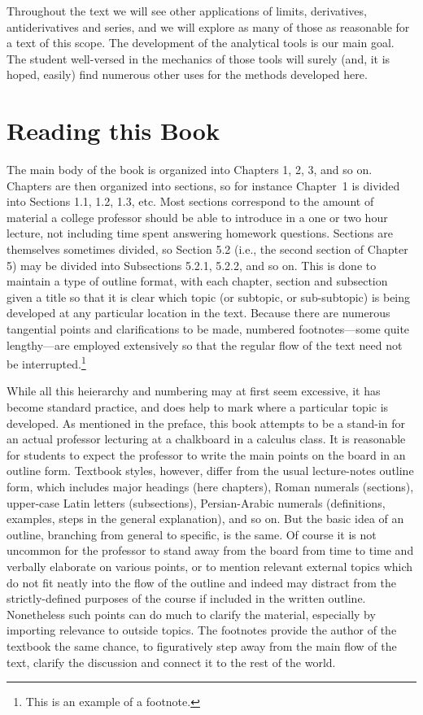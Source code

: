 Throughout the text we will see other applications of 
limits, derivatives, antiderivatives and series, and we will
explore as many of those as reasonable for a text of this scope.
The development of the analytical tools is our main goal.  The
student well-versed in the mechanics of those tools will surely
(and, it is hoped, easily) find
numerous other uses for the methods developed here.


\chapter{Reading this Book}

The main body of the book is organized into Chapters 1, 2, 3, and so on.
Chapters are then organized into sections, so for
instance Chapter~1 is
divided into Sections 1.1, 1.2, 1.3, etc.
Most sections correspond to the amount of material a college professor
should be able to introduce in a one or two hour lecture, not including
time spent answering homework questions.
Sections are themselves sometimes divided, so Section 5.2
(i.e., the second section of Chapter 5) may
be divided into Subsections 5.2.1, 5.2.2, and so on.
This is done to maintain a type of outline format,
with each chapter, section and subsection given a
title so that it is clear which topic (or subtopic, or sub-subtopic)
is being developed at any particular location in the text.  
Because there are numerous tangential points and clarifications
to be made, numbered footnotes---some
quite lengthy---are employed extensively so that the regular flow
of the text need not be interrupted.\footnote{%
This is an example of a footnote.  
}

While all this heierarchy and
numbering may at first seem excessive, it
has become standard practice, and does help to mark where
a particular topic is developed.
As mentioned in the preface, this book attempts to be a stand-in for
an actual professor lecturing at a chalkboard in a calculus class.
It is reasonable for students to expect the professor to write 
the main points on the board in an outline form.  Textbook styles,
however, differ from the usual lecture-notes outline form,
which includes major headings (here chapters), Roman numerals (sections),
upper-case Latin letters (subsections), Persian-Arabic numerals (definitions,
examples, steps in the general explanation), and so on.  But the 
basic idea of an outline, branching from general to specific, 
is the same.  Of course it is not uncommon for the professor to stand
away from the board from time to time and verbally elaborate on
various points, or to mention relevant external topics which do not
fit neatly into the flow of the outline and indeed may distract
from the strictly-defined purposes of the course if included in
the written outline.  Nonetheless such points can do much to 
clarify the material, especially by importing relevance to outside
topics.  The footnotes provide the author of the textbook
the same chance,
to figuratively step away from the main flow of the text, 
clarify the discussion and connect it to the rest of the world.

